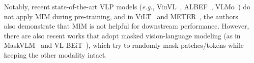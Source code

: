 Notably, recent state-of-the-art VLP models (\emph{e.g.}, VinVL~\citep{zhang2021vinvl}, ALBEF~\citep{li2021align}, VLMo~\citep{wang2021vlmo}) do not apply MIM during pre-training, and in ViLT~\citep{kim2021vilt} and METER~\citep{dou2021empirical}, the authors also demonstrate that MIM is not helpful for downstream performance. However, there are also recent works that adopt masked vision-language modeling (as in MaskVLM~\citep{kwon2022masked} and VL-BEiT~\citep{bao2022vl}), which try to randomly mask patches/tokens while keeping the other modality intact.


